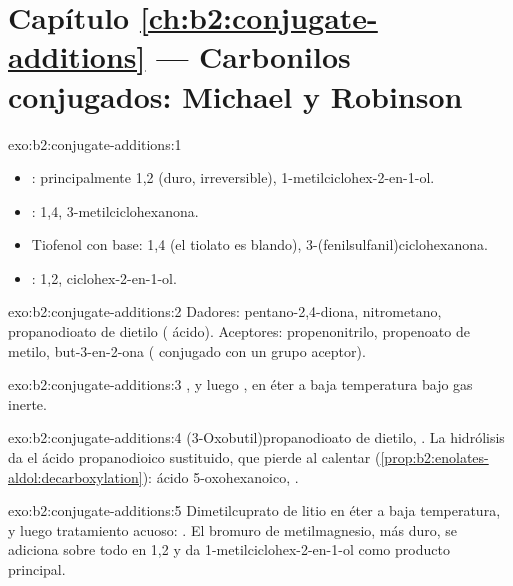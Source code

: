\section*{Capítulo \ref{ch:b2:conjugate-additions} --- Carbonilos conjugados: Michael y Robinson}

\begin{solution}{exo:b2:conjugate-additions:1}
\begin{itemize}
  \item {}: principalmente 1,2 (duro, irreversible), 1-metilciclohex-2-en-1-ol.
  \item {}: 1,4, 3-metilciclohexanona.
  \item Tiofenol con base: 1,4 (el tiolato es blando), 3-(fenilsulfanil)ciclohexanona.
  \item {}: 1,2, ciclohex-2-en-1-ol.
\end{itemize}
\end{solution}

\begin{solution}{exo:b2:conjugate-additions:2}
Dadores: pentano-2,4-diona, nitrometano, propanodioato de dietilo ( ácido). Aceptores:
propenonitrilo, propenoato de metilo, but-3-en-2-ona ( conjugado con un grupo aceptor).
\end{solution}

\begin{solution}{exo:b2:conjugate-additions:3}
, y luego , en éter a baja
temperatura bajo gas inerte.
\end{solution}

\begin{solution}{exo:b2:conjugate-additions:4}
(3-Oxobutil)propanodioato de dietilo, . La hidrólisis da el ácido propanodioico
sustituido, que pierde  al calentar (\cref{prop:b2:enolates-aldol:decarboxylation}):
ácido 5-oxohexanoico, .
\end{solution}

\begin{solution}{exo:b2:conjugate-additions:5}
Dimetilcuprato de litio en éter a baja temperatura, y luego tratamiento acuoso: .
El bromuro de metilmagnesio, más duro, se adiciona sobre todo en 1,2 y da 1-metilciclohex-2-en-1-ol como producto
principal.
\end{solution}

